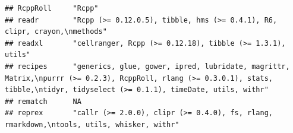 \documentclass[]{article}
\begin{document}
\begin{verbatim}
## RcppRoll     "Rcpp"                                                                                                                                                                                                                                                                                                                                                                                                                                                                                
## readr        "Rcpp (>= 0.12.0.5), tibble, hms (>= 0.4.1), R6, clipr, crayon,\nmethods"                                                                                                                                                                                                                                                                                                                                                                                                             
## readxl       "cellranger, Rcpp (>= 0.12.18), tibble (>= 1.3.1), utils"                                                                                                                                                                                                                                                                                                                                                                                                                             
## recipes      "generics, glue, gower, ipred, lubridate, magrittr, Matrix,\npurrr (>= 0.2.3), RcppRoll, rlang (>= 0.3.0.1), stats, tibble,\ntidyr, tidyselect (>= 0.1.1), timeDate, utils, withr"                                                                                                                                                                                                                                                                                                    
## rematch      NA                                                                                                                                                                                                                                                                                                                                                                                                                                                                                    
## reprex       "callr (>= 2.0.0), clipr (>= 0.4.0), fs, rlang, rmarkdown,\ntools, utils, whisker, withr"                                                                                                                                                                                                                                                                                                                                                                                             

\end{verbatim}
\end{document}
